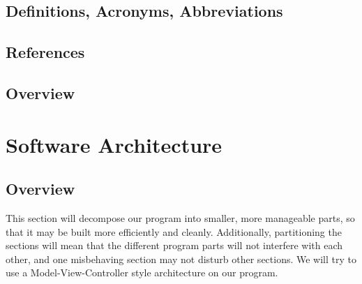 \documentclass[12pt]{article} %
\begin{document}



\subsection{Definitions, Acronyms, Abbreviations} %


\subsection{References} %



\subsection{Overview} %


\section{Software Architecture} %


\subsection{Overview} %

This section will decompose our program into smaller, more manageable parts, so that it may be built more efficiently and cleanly. Additionally, partitioning the sections will mean that the different program parts will not interfere with each other, and one misbehaving section may not disturb other sections. We will try to use a Model-View-Controller style architecture on our program.
\end{document}
